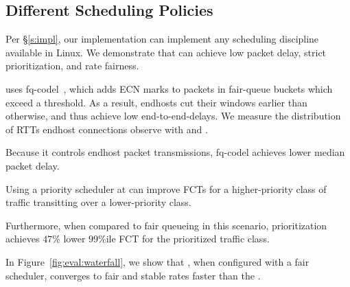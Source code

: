 \subsection{Different Scheduling Policies}\label{s:eval:policies}
Per \S\ref{s:impl}, our \name implementation can implement any scheduling discipline available in Linux. We demonstrate that \name can achieve low packet delay, strict prioritization, and rate fairness.

\name uses fq-codel~\cite{fq-codel}, which adds ECN marks to packets in fair-queue buckets which exceed a threshold. 
As a result, endhosts cut their windows earlier than otherwise, and thus achieve low end-to-end-delays.
We measure the distribution of RTTs endhost connections observe with \name and \baseline.

Because it controls endhost packet transmissions, fq-codel achieves \delaysImprovement lower median packet delay.

\label{s:eval:strictprio}
Using a priority scheduler at \name can improve FCTs for a higher-priority class of traffic transitting \name over a lower-priority class. 

Furthermore, when compared to fair queueing in this scenario, prioritization achieves $47$\% lower $99$\%ile FCT for the prioritized traffic class.


\label{s:eval:waterfall}
In Figure~\ref{fig:eval:waterfall}, we show that \name, when configured with a fair scheduler, converges to fair and stable rates faster than the \baseline.


